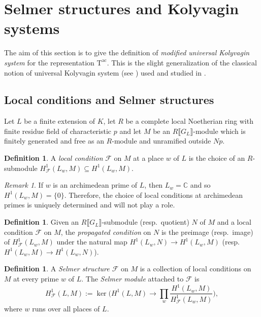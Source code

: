 \documentclass[12pt,reqno]{amsart}
\theoremstyle{definition}
\newtheorem{definition}[theorem]{Definition}
\theoremstyle{remark}
\newtheorem{remark}[theorem]{Remark}
\newcommand{\numberset}{\mathbb}
\newcommand{\C}{\numberset{C}}
\newcommand{\T}{\boldsymbol{\mathrm{T}}}
\newcommand{\ac}{\mathrm{ac}}
\begin{document}
\section{Selmer structures and Kolyvagin systems}\label{sec:selmer-structures-and-kolyvagin-systems}

The aim of this section is to give the definition of \emph{modified universal Kolyvagin system} for the representation $\T^{\ac}$. This is the slight generalization of the classical notion of universal Kolyvagin system (see \cite{Mazur-Rubin:Kolyvagin-systems, Howard04:heegner-point-kolyvagin-system, Buyukboduk:deformations-of-kolyvagin-systems}) used and studied in \cite{mastella-zerman2025:anticyclotomic}.

\subsection{Local conditions and Selmer structures}

Let $L$ be a finite extension of $K$, let $R$ be a complete local Noetherian ring with finite residue field of characteristic $p$ and let $M$ be an $R\llbracket G_L\rrbracket$-module which is finitely generated and free as an $R$-module and unramified outside $Np$.

\begin{definition}
    A \textit{local condition} $\mathcal{F}$ on $M$ at a place $w$ of $L$
is the choice of an $R$-submodule $H_{\mathcal{F}}^1(L_w,M)\subseteq H^1(L_w,M)$. 
\end{definition}

\begin{remark}
    If $w$ is an archimedean prime of $L$, then $L_w=\C$ and so $H^1(L_w,M)=\{0\}$. Therefore, the choice of local conditions at archimedean primes is uniquely determined and will not play a role.
\end{remark}


 \begin{definition}\label{dfn:propagated-condition}
     Given an $R\llbracket G_L\rrbracket$-submodule (resp.~quotient) $N$ of $M$ and a local condition $\mathcal{F}$ on $M$, the \emph{propagated condition} on $N$ is the preimage (resp.~image) of $H_{\mathcal{F}}^1(L_w,M)$ under the natural map $H^1(L_w,N)\to H^1(L_w,M)$ (resp.~$ H^1(L_w,M)\to H^1(L_w,N)$).
 \end{definition}

 

 \begin{definition}
     A \emph{Selmer structure $\mathcal{F}$} on $M$ is a collection of local conditions on $M$ at every prime $w$ of $L$. The \emph{Selmer module} attached to $\mathcal{F}$ is
     \begin{equation*}
            H^1_{\mathcal{F}}(L,M):=\ker\bigg(H^1(L,M)\to\prod_w \frac{H^1(L_w,M)}{H^1_{\mathcal{F}}(L_w,M)}\bigg),
        \end{equation*}
        where $w$ runs over all places of $L$.
 \end{definition}
\end{document}

